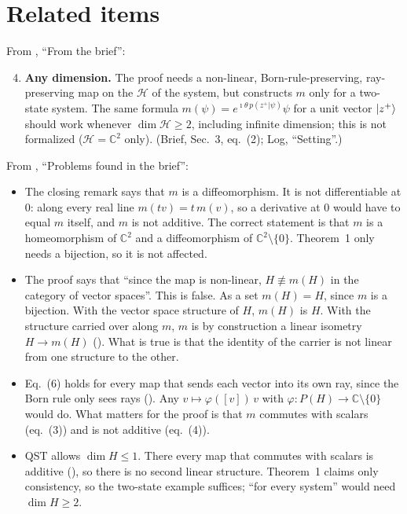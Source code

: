 \documentclass[11pt]{article}
\begin{document}
\section{Related items}\label{sec:related}
From , ``From the brief'':
\begin{enumerate}
\setcounter{enumi}{3}
\item \textbf{Any dimension.} The proof needs a non-linear, Born-rule-preserving, ray-preserving
  map on the $\mathcal{H}$ of the system, but constructs $m$ only for a two-state system. The
  same formula $m(\psi) = e^{\imath\theta\,p(z^+|\psi)}\psi$ for a unit vector $\ket{z^+}$
  should work whenever $\dim\mathcal{H} \ge 2$, including infinite dimension; this is not
  formalized ($\mathcal{H} = \mathbb{C}^2$ only). (Brief, Sec.~3, eq.~(2); Log, ``Setting''.)
\end{enumerate}
From , ``Problems found in the brief'':
\begin{itemize}
\item The closing remark says that $m$ is a diffeomorphism. It is not differentiable at $0$:
  along every real line $m(tv) = t\,m(v)$, so a derivative at $0$ would have to equal $m$
  itself, and $m$ is not additive. The correct statement is that $m$ is a homeomorphism of
  $\mathbb{C}^2$ and a diffeomorphism of $\mathbb{C}^2\setminus\{0\}$. Theorem~1 only needs a
  bijection, so it is not affected.
\item The proof says that ``since the map is non-linear, $H \not\equiv m(H)$ in the category of
  vector spaces''. This is false. As a set $m(H) = H$, since $m$ is a bijection. With the vector
  space structure of $H$, $m(H)$ is $H$. With the structure carried over along $m$, $m$ is by
  construction a linear isometry $H \to m(H)$ (). What is true is that
  the identity of the carrier is not linear from one structure to the other.
\item Eq.~(6) holds for every map that sends each vector into its own ray, since the Born rule
  only sees rays (). Any $v \mapsto \varphi([v])\,v$ with
  $\varphi \colon P(H) \to \mathbb{C}\setminus\{0\}$ would do. What matters for the proof is
  that $m$ commutes with scalars (eq.~(3)) and is not additive (eq.~(4)).
\item QST allows $\dim H \le 1$. There every map that commutes with scalars is additive
  (), so there is no second linear structure. Theorem~1 claims only
  consistency, so the two-state example suffices; ``for every system'' would need
  $\dim H \ge 2$.
\end{itemize}
\end{document}
